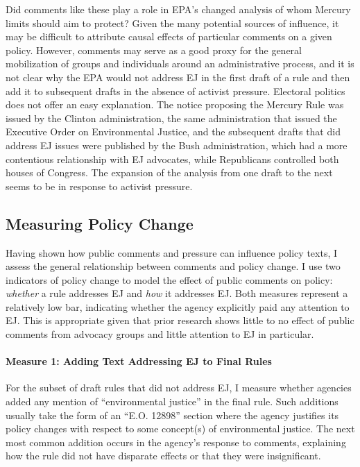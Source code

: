 \documentclass[
      12pt,
        ]{article}
\begin{document}
Did comments like these play a role in EPA's changed analysis of
whom Mercury limits should aim to protect?
Given the many potential sources of influence, it may be difficult to
attribute causal effects of particular comments on a given policy.
However, comments may serve as a good proxy for the general mobilization
of groups and individuals around an administrative process, and it is
not clear why the EPA would not address EJ in the first
draft of a rule and then add it to subsequent drafts in the absence of
activist pressure. Electoral politics does not offer an easy
explanation. The notice proposing the Mercury Rule was issued by the
Clinton administration, the same administration that issued the
Executive Order on Environmental Justice, and the subsequent drafts that
did address EJ issues were published by the Bush
administration, which had a more contentious relationship with
EJ advocates, while Republicans controlled both
houses of Congress. The expansion of the analysis from one draft to the
next seems to be in response to activist pressure.

\hypertarget{measuring-policy-change}{%
\subsection{Measuring Policy Change}\label{measuring-policy-change}}

Having shown how public comments and pressure can influence policy texts, I assess the general relationship between comments and policy change. I use two indicators of policy change to model the effect of public comments on policy: \emph{whether} a rule addresses EJ and \emph{how} it addresses EJ. Both measures represent a relatively low bar, indicating whether the agency explicitly paid any attention to EJ. This is appropriate given that prior research shows little to no effect of public comments from advocacy groups and little attention to EJ in particular.

\hypertarget{measure-1-adding-text-addressing-ej-to-final-rules}{%
\paragraph{Measure 1: Adding Text Addressing EJ to Final Rules}\label{measure-1-adding-text-addressing-ej-to-final-rules}}

For the subset of draft rules that did not address EJ, I measure whether agencies added any mention of ``environmental justice'' in the final rule. Such additions usually take the form of an ``E.O. 12898'' section where the agency justifies its policy changes with respect to some concept(s) of environmental justice. The next most common addition occurs in the agency's response to comments, explaining how the rule did not have disparate effects or that they were insignificant.
\end{document}
